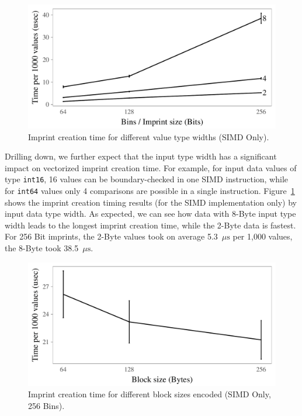 \documentclass[sigconf]{acmart}
\begin{document}
\begin{figure}[ht]
\begin{center}
\includegraphics[width=\columnwidth,trim=0mm 0mm 0mm 0mm,clip]{typewidth1.pdf}
\end{center}
\caption{Imprint creation time for different value type widths (SIMD Only).\label{fig:typewidth1}}
\end{figure}

Drilling down, we further expect that the input type width has a significant impact on vectorized imprint creation time. For example, for input data values of type \texttt{int16}, 16 values can be boundary-checked in one SIMD instruction, while for \texttt{int64} values only 4 comparisons are possible in a single instruction. Figure~\ref{fig:typewidth1} shows the imprint creation timing results (for the SIMD implementation only) by input data type width. As expected, we can see how data with 8-Byte input type width leads to the longest imprint creation time, while the 2-Byte data is fastest. For 256 Bit imprints, the 2-Byte values took on average 5.3~\(\mu\text{s}\) per 1,000 values, the 8-Byte took 38.5~\(\mu\text{s}\).

\begin{figure}[ht]
\begin{center}
\includegraphics[width=\columnwidth,trim=0mm 0mm 0mm 0mm,clip]{block_size_bytes1.pdf}
\end{center}
\caption{Imprint creation time for different block sizes encoded (SIMD Only, 256 Bins).\label{fig:bytesperblock1}}
\end{figure}
\end{document}
